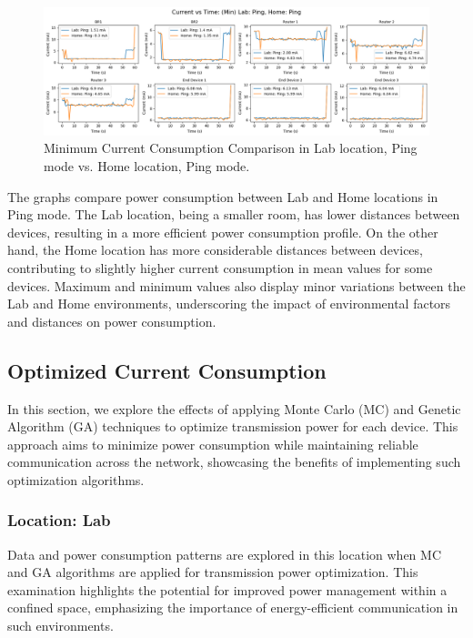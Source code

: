 \begin{figure}[H]
  \centering
  \includegraphics[width=1\textwidth]{images/research_results/current_consumption_analysis/maximum/home/ping/comparison/lab_ping_vs_home_ping/min_comparison_lab_ping_vs_home_ping.png}
    \caption{Minimum Current Consumption Comparison in Lab location, Ping mode vs. Home location, Ping mode.}
    \label{fig:min_comparison_lab_ping_vs_home_ping}
\end{figure}

The graphs compare power consumption between Lab and Home locations in Ping mode. The Lab location, being a smaller room, has lower distances between devices, resulting in a more efficient power consumption profile. On the other hand, the Home location has more considerable distances between devices, contributing to slightly higher current consumption in mean values for some devices. Maximum and minimum values also display minor variations between the Lab and Home environments, underscoring the impact of environmental factors and distances on power consumption.


\subsection{Optimized Current Consumption}
In this section, we explore the effects of applying Monte Carlo (MC) and Genetic Algorithm (GA) techniques to optimize transmission power for each device. This approach aims to minimize power consumption while maintaining reliable communication across the network, showcasing the benefits of implementing such optimization algorithms.

\subsubsection{Location: Lab}
Data and power consumption patterns are explored in this location when MC and GA algorithms are applied for transmission power optimization. This examination highlights the potential for improved power management within a confined space, emphasizing the importance of energy-efficient communication in such environments.

